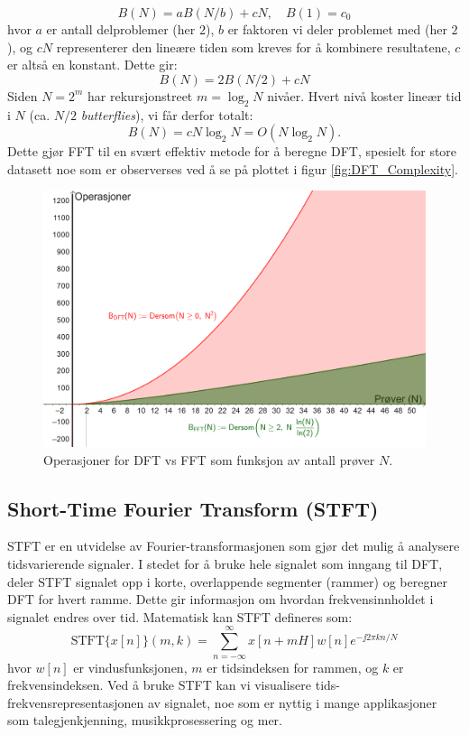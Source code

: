 \[
    B(N) = aB(N/b) + cN, \quad B(1) = c_0
\]
hvor $a$ er antall delproblemer (her $2$), $b$ er faktoren vi deler problemet med (her $2$), og $cN$ representerer den lineære tiden som kreves for å kombinere resultatene, $c$ er altså en konstant. Dette gir:
\[
    B(N) = 2B(N/2) + cN
\]
Siden $N=2^m$ har rekursjonstreet $m=\log_2 N$ nivåer. Hvert nivå koster lineær tid i $N$ (ca. $N/2$ \emph{butterflies}), vi får derfor totalt:
\[
    B(N)=cN\log_2 N=O(N\log_2 N).
\]
Dette gjør FFT til en svært effektiv metode for å beregne DFT, spesielt for store datasett noe som er observerses ved å se på plottet i figur \ref{fig:DFT_Complexity}.
\begin{figure}[h]
    \centering
    \includegraphics[width=.9\textwidth]{./Media/DFT_Complexity_VS_FFT.png}
    \caption{Operasjoner for DFT vs FFT som funksjon av antall prøver $N$.}
    \label{fig:FFT_Complexity}
\end{figure}
\clearpage 
\noindent
\subsection{Short-Time Fourier Transform (STFT)}
STFT er en utvidelse av Fourier-transformasjonen som gjør det mulig å analysere tidsvarierende signaler. I stedet for å bruke hele signalet som inngang til DFT, deler STFT signalet opp i korte, overlappende segmenter (rammer) og beregner DFT for hvert ramme. Dette gir informasjon om hvordan frekvensinnholdet i signalet endres over tid. Matematisk kan STFT defineres som:
\[
    \text{STFT}\{x[n]\}(m, k) = \sum_{n=-\infty}^{\infty} x[n+mH] w[n] e^{-\jj 2 \pi k n / N}
\]
hvor \(w[n]\) er vindusfunksjonen, \(m\) er tidsindeksen for rammen, og \(k\) er frekvensindeksen. Ved å bruke STFT kan vi visualisere tids-frekvensrepresentasjonen av signalet, noe som er nyttig i mange applikasjoner som talegjenkjenning, musikkprosessering og mer.

